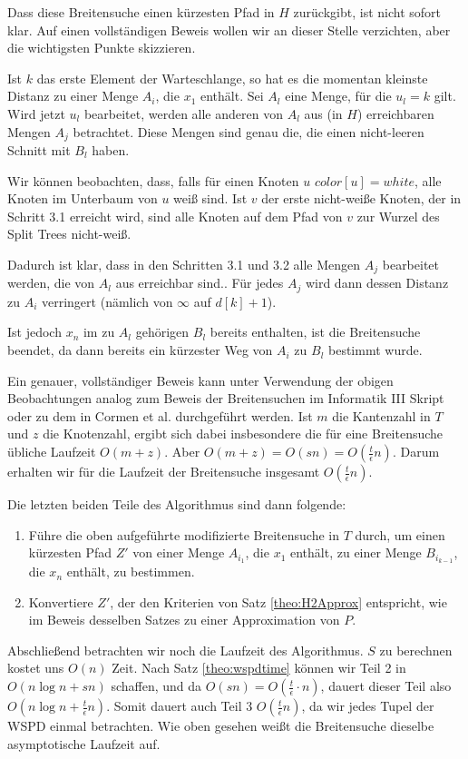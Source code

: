 \documentclass[11pt]{article}
\begin{document}
    Dass diese Breitensuche einen kürzesten Pfad in $H$ zurückgibt, ist nicht sofort klar. Auf einen vollständigen Beweis wollen wir an dieser Stelle verzichten, aber die wichtigsten Punkte skizzieren. 
    
    Ist $k$ das erste Element der Warteschlange, so hat es die momentan kleinste Distanz zu einer Menge $A_i$, die $x_1$ enthält. Sei $A_l$ eine Menge, für die $u_l = k$ gilt. Wird jetzt $u_l$ bearbeitet, werden alle anderen von $A_l$ aus (in $H$) erreichbaren Mengen $A_j$ betrachtet. Diese Mengen sind genau die, die einen nicht-leeren Schnitt mit $B_l$ haben. 
    
	Wir können beobachten, dass, falls für einen Knoten $u$ $color[u] = white$, alle Knoten im Unterbaum von $u$ weiß sind. Ist $v$ der erste nicht-weiße Knoten, der in Schritt 3.1 erreicht wird, sind alle Knoten auf dem Pfad von $v$ zur Wurzel des Split Trees nicht-weiß.
    
    Dadurch ist klar, dass in den Schritten 3.1 und 3.2 alle Mengen $A_j$ bearbeitet werden, die von $A_l$ aus erreichbar sind.. Für jedes $A_j$ wird dann dessen Distanz zu $A_i$ verringert (nämlich von $\infty$ auf $d[k]+1$). 
    
    Ist jedoch $x_n$ im zu $A_l$ gehörigen $B_l$ bereits enthalten, ist die Breitensuche beendet, da dann bereits ein kürzester Weg von $A_i$ zu $B_l$ bestimmt wurde.
    
    Ein genauer, vollständiger Beweis kann unter Verwendung der obigen Beobachtungen analog zum Beweis der Breitensuchen im Informatik III Skript \cite{hagerup} oder zu dem in Cormen et al. \cite{cormen} durchgeführt werden. Ist $m$ die Kantenzahl in $T$ und $z$ die Knotenzahl, ergibt sich dabei insbesondere die für eine Breitensuche übliche Laufzeit $O(m + z)$. Aber $O(m + z) = O(sn) = O(\frac{t}{\epsilon}n)$. Darum erhalten wir für die Laufzeit der Breitensuche insgesamt $O(\frac{t}{\epsilon}n)$.
    
    Die letzten beiden Teile des Algorithmus sind dann folgende:
    \begin{enumerate}[start=4, topsep=4mm]
    	\item Führe die oben aufgeführte modifizierte Breitensuche in $T$ durch, um einen kürzesten Pfad $Z'$ von einer Menge $A_{i_1}$, die $x_1$ enthält, zu einer Menge $B_{i_{k-1}}$, die $x_n$ enthält, zu bestimmen.
    	\item Konvertiere $Z'$, der den Kriterien von Satz \ref{theo:H2Approx} entspricht, wie im Beweis desselben Satzes zu einer Approximation von $P$.
    \end{enumerate}
    Abschließend betrachten wir noch die Laufzeit des Algorithmus. $S$ zu berechnen kostet uns $O(n)$ Zeit. Nach Satz \ref{theo:wspdtime} können wir Teil 2 in $O(n \log n + sn)$ schaffen, und da $O(sn) = O(\frac{t}{\epsilon}\cdot n)$, dauert dieser Teil also $O(n \log n + \frac{t}{\epsilon}n)$. Somit dauert auch Teil 3 $O(\frac{t}{\epsilon}n)$, da wir jedes Tupel der WSPD einmal betrachten. Wie oben gesehen weißt die Breitensuche dieselbe asymptotische Laufzeit auf. 
    
\end{document}
